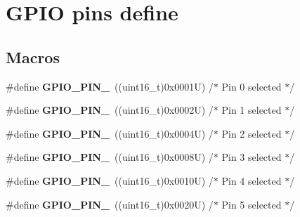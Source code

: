 \hypertarget{group___g_p_i_o__pins__define}{}\section{G\+P\+IO pins define}
\label{group___g_p_i_o__pins__define}
\subsection*{Macros}
\begin{DoxyCompactItemize}
\item 
\mbox{\label{group___g_p_i_o__pins__define_ga176efbf43a259b7bb0a85a47401505be}} 
\#define {\bfseries G\+P\+I\+O\+\_\+\+P\+I\+N\+\_}~((uint16\+\_\+t)0x0001\+U)  /$\ast$ Pin 0 selected    $\ast$/
\item 
\mbox{\label{group___g_p_i_o__pins__define_ga6c35af4e75c3cb57bb650feaa7a136b5}} 
\#define {\bfseries G\+P\+I\+O\+\_\+\+P\+I\+N\+\_}~((uint16\+\_\+t)0x0002\+U)  /$\ast$ Pin 1 selected    $\ast$/
\item 
\mbox{\label{group___g_p_i_o__pins__define_ga6eee38b797a7268f04357dfa2759efd2}} 
\#define {\bfseries G\+P\+I\+O\+\_\+\+P\+I\+N\+\_}~((uint16\+\_\+t)0x0004\+U)  /$\ast$ Pin 2 selected    $\ast$/
\item 
\mbox{\label{group___g_p_i_o__pins__define_gadcaf899c018a0dde572b5af783565c62}} 
\#define {\bfseries G\+P\+I\+O\+\_\+\+P\+I\+N\+\_}~((uint16\+\_\+t)0x0008\+U)  /$\ast$ Pin 3 selected    $\ast$/
\item 
\mbox{\label{group___g_p_i_o__pins__define_gab3871e35868deecd260e586ad70d4b83}} 
\#define {\bfseries G\+P\+I\+O\+\_\+\+P\+I\+N\+\_}~((uint16\+\_\+t)0x0010\+U)  /$\ast$ Pin 4 selected    $\ast$/
\item 
\mbox{\label{group___g_p_i_o__pins__define_ga01cc9ed93f6fd12fd3403362779aaa18}} 
\#define {\bfseries G\+P\+I\+O\+\_\+\+P\+I\+N\+\_}~((uint16\+\_\+t)0x0020\+U)  /$\ast$ Pin 5 selected    $\ast$/
\item 
\mbox{\label{group___g_p_i_o__pins__define_ga9089f18f20ec88ee38ce6f27389e6d7e}} 

\end{DoxyCompactItemize}
